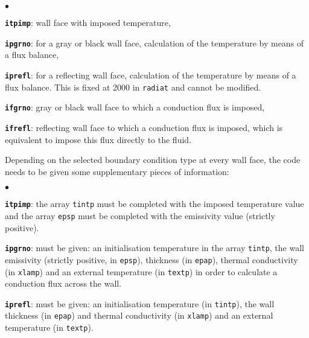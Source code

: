 {{\begin{list}{$\bullet$}{}

\item \texttt{\textbf{itpimp}}: wall face with imposed temperature,

\item \texttt{\textbf{ipgrno}}: for a gray or black wall face, calculation of the
      temperature by means of a flux balance,

\item \texttt{\textbf{iprefl}}: for a reflecting wall face, calculation of the
      temperature by means of a flux balance.
 This is fixed at 2000 in \texttt{radiat} and cannot be modified.

\item \texttt{\textbf{ifgrno}}: gray or black wall face to which a conduction
      flux is imposed,

\item \texttt{\textbf{ifrefl}}: reflecting wall face to which a conduction
      flux is imposed, which is equivalent to impose this flux directly
      to the fluid.

\end{list}

\noindent
Depending on the selected boundary condition type at every wall face,
the code needs to be given some supplementary pieces of information:

\begin{list}{$\bullet$}{}

\item \texttt{\textbf{itpimp}}: the array \texttt{tintp} must be completed
      with the imposed temperature value and the array \texttt{epsp} must
      be completed with the emissivity value (strictly positive).

\item \texttt{\textbf{ipgrno}}: must be given: an initialisation temperature in
      the array \texttt{tintp}, the wall emissivity (strictly positive, in
      \texttt{epsp}), thickness (in \texttt{epap}), thermal conductivity
      (in \texttt{xlamp}) and an external temperature (in \texttt{textp})
      in order to calculate a conduction flux across the wall.

\item \texttt{\textbf{iprefl}}: must be given: an initialisation temperature (in
      \texttt{tintp}), the wall thickness (in \texttt{epap}) and thermal conductivity (in
      \texttt{xlamp}) and an external temperature (in \texttt{textp}).


\end{list}}}
